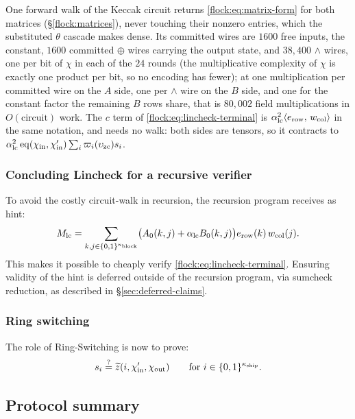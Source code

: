 One forward walk of the Keccak circuit returns \eqref{flock:eq:matrix-form} for both matrices (\S\ref{flock:matrices}), never touching their nonzero entries, which the substituted $\theta$ cascade makes dense. Its committed wires are $1600$ free inputs, the constant, $1600$ committed $\oplus$ wires carrying the output state, and $38{,}400$ $\wedge$ wires, one per bit of $\chi$ in each of the $24$ rounds (the multiplicative complexity of $\chi$ is exactly one product per bit, so no encoding has fewer); at one multiplication per committed wire on the $A$ side, one per $\wedge$ wire on the $B$ side, and one for the constant factor the remaining $B$ rows share, that is $80{,}002$ field multiplications in $O(\text{circuit})$ work. The $c$ term of \eqref{flock:eq:lincheck-terminal} is $\alpha_{\mathrm{lc}}^2\langle e_{\mathrm{row}},\, w_{\mathrm{col}} \rangle$ in the same notation, and needs no walk: both sides are tensors, so it contracts to $\alpha_{\mathrm{lc}}^2\operatorname{eq}(\chi_{\mathrm{in}},\chi'_{\mathrm{in}})\sum_i\varpi_i(\upsilon_{\mathrm{zc}})s_i$.

\subsubsection{Concluding Lincheck for a recursive verifier}\label{flock:defer}

To avoid the costly circuit-walk in recursion, the recursion program receives as hint:
\begin{equation}\label{flock:eq:matpart}
M_{\mathrm{lc}}=\sum_{k,j\in\{0,1\}^{\kappa_{\mathrm{block}}}}\bigl(A_0(k,j)+\alpha_{\mathrm{lc}} B_0(k,j)\bigr)e_{\mathrm{row}}(k)\,w_{\mathrm{col}}(j).
\end{equation}
This makes it possible to cheaply verify \eqref{flock:eq:lincheck-terminal}. Ensuring validity of the hint is deferred outside of the recursion program, via sumcheck reduction, as described in \S\ref{sec:deferred-claims}.

\subsubsection{Ring switching}\label{flock:ringswitch}

The role of Ring-Switching is now to prove:
\[
s_i \stackrel{?}{=} \widetilde{z}(i,\chi'_{\mathrm{in}},\chi_{\mathrm{out}})\qquad\text{for }i\in\{0,1\}^{\kappa_{\mathrm{skip}}}.
\]


\subsection{Protocol summary}\label{flock:summary}

